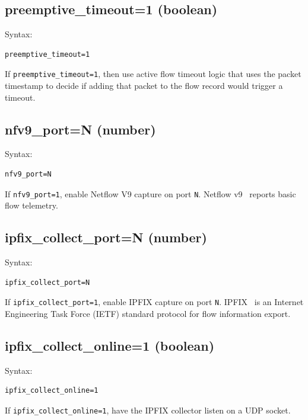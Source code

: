 \documentclass{book}
\begin{document}
\subsection{preemptive\_timeout=1 (boolean)}
\label{preemptivetimeout}
\begin{mdframed}[style=aaa]
Syntax:
  \begin{verbatim}
preemptive_timeout=1   
  \end{verbatim}
\end{mdframed}
If \texttt{preemptive\_timeout=1}, then use active flow timeout logic
that uses the packet timestamp to decide if adding that packet to the
flow record would trigger a timeout.

\subsection{nfv9\_port=N (number)}
\label{nfv9port}
\begin{mdframed}[style=aaa]
Syntax:
  \begin{verbatim}
nfv9_port=N                
  \end{verbatim}
\end{mdframed}
If \texttt{nfv9\_port=1}, enable Netflow V9 capture on port \texttt{N}.
Netflow v9~\cite{rfc3954} reports basic flow telemetry.


\subsection{ipfix\_collect\_port=N (number)}
\label{ipfixcollectport}
\begin{mdframed}[style=aaa]
Syntax:
  \begin{verbatim}
ipfix_collect_port=N       
  \end{verbatim}
\end{mdframed}
If \texttt{ipfix\_collect\_port=1}, enable IPFIX capture on port \texttt{N}.
IPFIX~\cite{rfc3955,rfc5101,rfc5103,rfc5153,rfc5472,rfc5473,rfc5610,rfc5655}
is an Internet Engineering Task Force (IETF) standard protocol for
flow information export.

\subsection{ipfix\_collect\_online=1 (boolean)}
\label{ipfixcollectonline}
\begin{mdframed}[style=aaa]
Syntax:
  \begin{verbatim}
ipfix_collect_online=1     
  \end{verbatim}
\end{mdframed}
If \texttt{ipfix\_collect\_online=1}, have the IPFIX collector listen
on a UDP socket.
\end{document}
